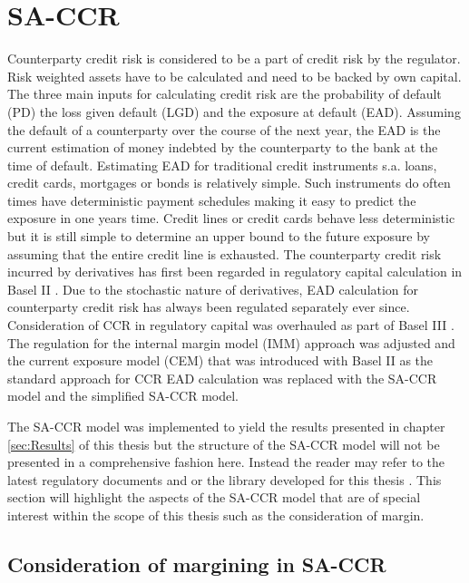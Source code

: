 \documentclass[../Thesis_AHoecherl.tex]{subfiles}
\begin{document}
\section{SA-CCR}\label{SA-CCR}

Counterparty credit risk is considered to be a part of credit risk by the regulator. Risk weighted assets have to be calculated and need to be backed by own capital. The three main inputs for calculating credit risk are the probability of default (PD) the loss given default (LGD) and the exposure at default (EAD). Assuming the default of a counterparty over the course of the next year, the EAD is the current estimation of money indebted by the counterparty to the bank at the time of default. Estimating EAD for traditional credit instruments s.a. loans, credit cards, mortgages or bonds is relatively simple. Such instruments do often times have deterministic payment schedules making it easy to predict the exposure in one years time. Credit lines or credit cards behave less deterministic but it is still simple to determine an upper bound to the future exposure by assuming that the entire credit line is exhausted.
The counterparty credit risk incurred by derivatives has first been regarded in regulatory capital calculation in Basel II \cite{basel2}. Due to the stochastic nature of derivatives, EAD calculation for counterparty credit risk has always been regulated separately ever since. Consideration of \gls{CCR} in regulatory capital was overhauled as part of Basel III \cite{CRE}. The regulation for the internal margin model (\gls{IMM}) approach was adjusted and the current exposure model (\gls{CEM}) that was introduced with Basel II as the standard approach for \gls{CCR} \gls{EAD} calculation was replaced with the \gls{SA-CCR} model and the simplified \gls{SA-CCR} model.

The \gls{SA-CCR} model was implemented to yield the results presented in chapter \ref{sec:Results} of this thesis but the structure of the \gls{SA-CCR} model will not be presented in a comprehensive fashion here. Instead the reader may refer to the latest regulatory documents \cite[Article 274 and following]{CRRII} and \cite{EBA_2019} or the library developed for this thesis \cite{Hoecherl2020}.
This section will highlight the aspects of the SA-CCR model that are of special interest within the scope of this thesis such as the consideration of margin. 

\subsection{Consideration of margining in SA-CCR}
\end{document}
